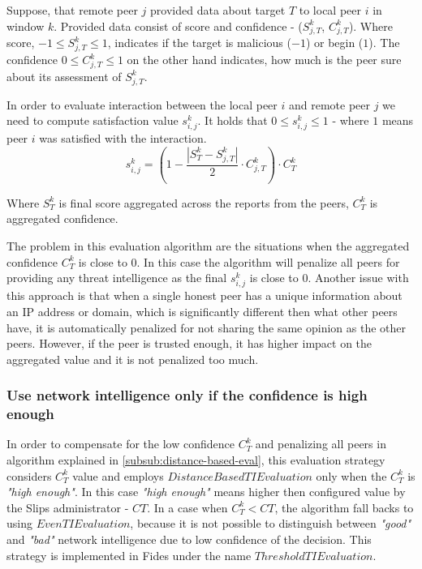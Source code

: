 Suppose, that remote peer $j$ provided data about target $T$ to local peer $i$ in window $k$. Provided data consist of score and confidence - ($S^{k}_{j, T}$, $C^{k}_{j, T}$). Where score,  $-1 \leq S^{k}_{j, T} \leq 1$, indicates if the target is malicious ($-1$) or begin ($1$). The confidence $0 \leq C^{k}_{j, T} \leq 1$ on the other hand indicates, how much is the peer sure about its assessment of $S^{k}_{j, T}$.

In order to evaluate interaction between the local peer $i$ and remote peer $j$ we need to compute satisfaction value $s^{k}_{i, j}$. 
It holds that  $0 \leq s^{k}_{i, j} \leq 1$ - where $1$ means peer $i$ was satisfied with the interaction.
\begin{equation}
s^{k}_{i, j} = (1 - \frac{|{S}^{k}_{T} - S^{k}_{j, T}|}{2} \cdot C^{k}_{j, T}) \cdot C^{k}_{T}
\end{equation}

Where $S^{k}_{T}$ is final score aggregated across the reports from the peers, $C^{k}_{T}$ is aggregated confidence.

The problem in this evaluation algorithm are the situations when the aggregated confidence $C^{k}_{T}$ is close to $0$. In this case the algorithm will penalize all peers for providing any threat intelligence as the final $s^{k}_{i, j}$ is close to $0$. Another issue with this approach is that when a single honest peer has a unique information about an IP address or domain, which is significantly different then what other peers have, it is automatically penalized for not sharing the same opinion as the other peers. However, if the peer is trusted enough, it has higher impact on the aggregated value and it is not penalized too much.

\subsubsection{Use network intelligence only if the confidence is high enough}
\label{subsubsec:network-intelligence-conf-high-enough}
In order to compensate for the low confidence $C^{k}_{T}$ and penalizing all peers in algorithm explained in \ref{subsub:distance-based-eval}, this evaluation strategy considers $C^{k}_{T}$ value and employs  $DistanceBasedTIEvaluation$ only when the  $C^{k}_{T}$ is \textit{"high enough"}. In this case \textit{"high enough"} means higher then configured value by the Slips administrator - ${CT}$.
In a case when  $C^{k}_{T} < {CT}$, the algorithm fall backs to using $EvenTIEvaluation$, because it is not possible to distinguish between \textit{"good"} and \textit{"bad"} network intelligence due to low confidence of the decision. 
This strategy is implemented in Fides under the name $ThresholdTIEvaluation$.

